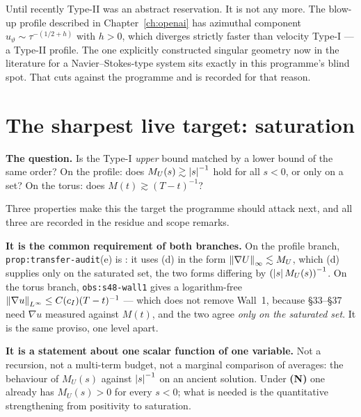 \begin{obsv}
\label{obs:wall3-example}
Until recently Type-II was an abstract reservation. It is not any more. The
blow-up profile described in Chapter~\ref{ch:openai} has azimuthal component
\(u_\vartheta\sim\tau^{-(1/2+h)}\) with \(h>0\), which diverges strictly
faster than velocity Type-I --- a Type-II profile. The one explicitly
constructed singular geometry now in the literature for a
Navier--Stokes-type system sits exactly in this programme's blind spot. That
cuts against the programme and is recorded for that reason.
\end{obsv}

\section{The sharpest live target: saturation}
\label{sec:saturation}

\begin{record}
\textbf{The question.} Is the Type-I \emph{upper} bound matched by a lower
bound of the same order? On the profile: does \(M_U(s)\gtrsim\left|s\right|^{-1}\)
hold for all \(s<0\), or only on a set? On the torus: does
\(M(t)\gtrsim(T-t)^{-1}\)?
\end{record}

Three properties make this the target the programme should attack next, and
all three are recorded in the  residue and scope remarks.

\textbf{It is the common requirement of both branches.} On the profile branch,
\texttt{prop:transfer-audit}(e) is : it uses (d) in the
form \(\left\|\nabla U\right\|_\infty\lesssim M_U\), which (d) supplies only on the
saturated set, the two forms differing by \(\left(\left|s\right|M_U(s)\right)^{-1}\).
On the torus branch, \texttt{obs:s48-wall1} gives a logarithm-free
\(\left\|\nabla u\right\|_{L^\infty}\le C(c_I)(T-t)^{-1}\) --- which does not remove
Wall~1, because \S33--\S37 need \(\nabla u\) measured against \(M(t)\), and
the two agree \emph{only on the saturated set}. It is the same proviso, one
level apart.

\textbf{It is a statement about one scalar function of one variable.} Not a
recursion, not a multi-term budget, not a marginal comparison of averages: the
behaviour of \(M_U(s)\) against \(\left|s\right|^{-1}\) on an ancient solution. Under
\textbf{(N)} one already has \(M_U(s)>0\) for every \(s<0\); what is needed is
the quantitative strengthening from positivity to saturation.

